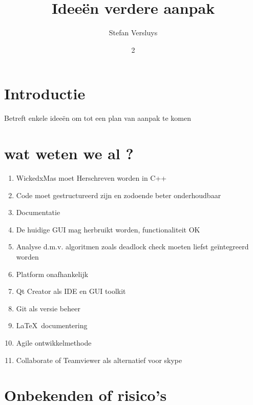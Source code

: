 \documentclass[a4paper]{article}
\title{Ideeën verdere aanpak}
\author{Stefan Versluys}
\date 23 september 2014
\begin{document}
\maketitle


\section{Introductie}

Betreft enkele ideeën om tot een plan van aanpak te komen


\section{wat weten we al ?}

\begin{enumerate}
\item WickedxMas moet Herschreven worden in C++
\item Code moet gestructureerd zijn en zodoende beter onderhoudbaar
\item Documentatie
\item De huidige GUI mag herbruikt worden, functionaliteit OK
\item Analyse d.m.v. algoritmen zoals deadlock check moeten liefst geïntegreerd worden
\item Platform onafhankelijk
\item Qt Creator als IDE en GUI toolkit
\item Git als versie beheer
\item \LaTeX\ documentering
\item Agile ontwikkelmethode
\item Collaborate of Teamviewer als alternatief voor skype
\end{enumerate}

\section{Onbekenden of risico's}
\end{document}
